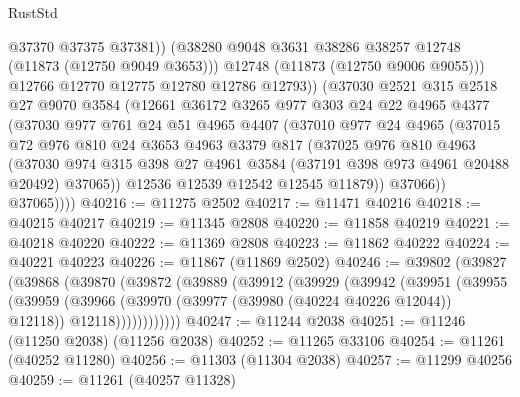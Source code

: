 \begin{lexlean}{RustStd}
\begin{coremodule}
                    @37370
                    @37375
                    @37381))
                (@38280 @9048 @3631 @38286 @38257 @12748 (@11873 (@12750 @9049 @3653)))
                @12748
                (@11873 (@12750 @9006 @9055)))
              @12766
              @12770
              @12775
              @12780
              @12786
              @12793))
          (@37030
            @2521
            @315
            @2518
            @27
            @9070
            @3584
            (@12661
              @36172
              @3265
              @977
              @303
              @24
              @22
              @4965
              @4377
              (@37030
                @977
                @761
                @24
                @51
                @4965
                @4407
                (@37010
                  @977
                  @24
                  @4965
                  (@37015
                    @72
                    @976
                    @810
                    @24
                    @3653
                    @4963
                    @3379
                    @817
                    (@37025
                      @976
                      @810
                      @4963
                      (@37030
                        @974
                        @315
                        @398
                        @27
                        @4961
                        @3584
                        (@37191 @398 @973 @4961 @20488 @20492)
                        @37065))
                    @12536
                    @12539
                    @12542
                    @12545
                    @11879))
                @37066))
            @37065))))
@40216 := @11275 @2502
@40217 := @11471 @40216
@40218 := @40215 @40217
@40219 := @11345 @2808
@40220 := @11858 @40219
@40221 := @40218 @40220
@40222 := @11369 @2808
@40223 := @11862 @40222
@40224 := @40221 @40223
@40226 := @11867 (@11869 @2502)
@40246 := @39802
    (@39827
      (@39868
        (@39870
          (@39872
            (@39889
              (@39912
                (@39929
                  (@39942
                    (@39951
                      (@39955
                        (@39959
                          (@39966
                            (@39970 (@39977 (@39980 (@40224 @40226 @12044)) @12118))
                            @12118))))))))))))
@40247 := @11244 @2038
@40251 := @11246 (@11250 @2038) (@11256 @2038)
@40252 := @11265 @33106
@40254 := @11261 (@40252 @11280)
@40256 := @11303 (@11304 @2038)
@40257 := @11299 @40256
@40259 := @11261 (@40257 @11328)

\end{coremodule}
\end{lexlean}
